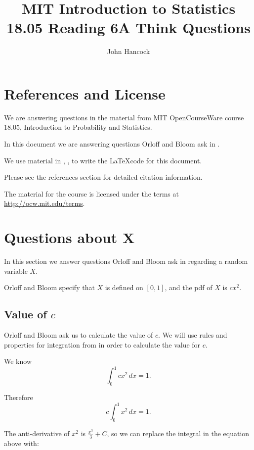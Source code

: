 \documentclass[a4paper,11pt]{article}
\author{John Hancock}
\title{MIT Introduction to Statistics 18.05 Reading 6A Think Questions }
\begin{document}
\maketitle
\tableofcontents
\section{References and License}
We are answering questions in the material from MIT OpenCourseWare
course 18.05, Introduction to Probability and Statistics.

In this document we are answering questions Orloff and Bloom ask in
\cite{slides6}.

We use material in \cite{cubeRoot}, \cite{bold}, \cite{charList}
to write the \LaTeX code for this
document.

Please see the references section for detailed citation information.

The material for the course is licensed under the terms at
\url{http://ocw.mit.edu/terms}.



\section{Questions about X}

In this section we answer questions Orloff and Bloom ask in \cite{reading6a}
regarding a random variable $X$.

Orloff and Bloom specify that $X$ is defined on $\left[ 0, 1 \right]$, and
the pdf of $X$ is $cx^2$.

\subsection{Value of $c$}

Orloff and Bloom ask us to calculate the value of $c$.  We will use rules
and properties for integration from \cite{basicInt} in order to calculate
the value for $c$.

We know
\begin{equation}
  \int_0^1 cx^2 \, dx = 1.
\end{equation}

Therefore
\begin{equation}
  c \int_0^1 x^2 \, dx = 1.
\end{equation}

The anti-derivative of $x^2$ is $\frac{x^3}{3} +C$, so we can replace the
integral in the equation above with:
\end{document}
